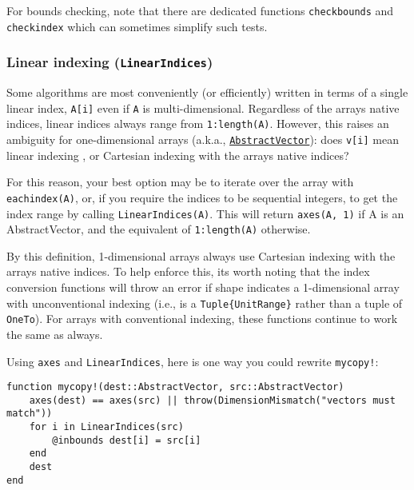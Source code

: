 For bounds checking, note that there are dedicated functions \texttt{checkbounds} and \texttt{checkindex} which can sometimes simplify such tests.



\hypertarget{15690038127583202025}{}


\subsubsection{Linear indexing (\texttt{LinearIndices})}



Some algorithms are most conveniently (or efficiently) written in terms of a single linear index, \texttt{A[i]} even if \texttt{A} is multi-dimensional. Regardless of the array{\textquotesingle}s native indices, linear indices always range from \texttt{1:length(A)}. However, this raises an ambiguity for one-dimensional arrays (a.k.a., \hyperlink{12517057979818647811}{\texttt{AbstractVector}}): does \texttt{v[i]} mean linear indexing , or Cartesian indexing with the array{\textquotesingle}s native indices?



For this reason, your best option may be to iterate over the array with \texttt{eachindex(A)}, or, if you require the indices to be sequential integers, to get the index range by calling \texttt{LinearIndices(A)}. This will return \texttt{axes(A, 1)} if A is an AbstractVector, and the equivalent of \texttt{1:length(A)} otherwise.



By this definition, 1-dimensional arrays always use Cartesian indexing with the array{\textquotesingle}s native indices. To help enforce this, it{\textquotesingle}s worth noting that the index conversion functions will throw an error if shape indicates a 1-dimensional array with unconventional indexing (i.e., is a \texttt{Tuple\{UnitRange\}} rather than a tuple of \texttt{OneTo}). For arrays with conventional indexing, these functions continue to work the same as always.



Using \texttt{axes} and \texttt{LinearIndices}, here is one way you could rewrite \texttt{mycopy!}:




\begin{verbatim}
function mycopy!(dest::AbstractVector, src::AbstractVector)
    axes(dest) == axes(src) || throw(DimensionMismatch("vectors must match"))
    for i in LinearIndices(src)
        @inbounds dest[i] = src[i]
    end
    dest
end
\end{verbatim}



